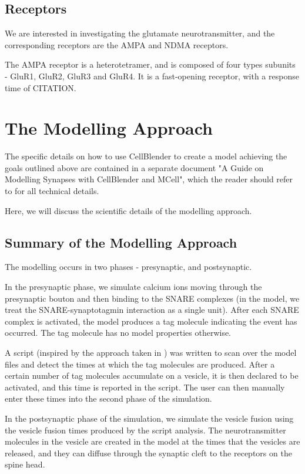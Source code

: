 \documentclass[a4paper]{article}
\begin{document}
\subsection{Receptors}
We are interested in investigating the glutamate neurotransmitter, and the corresponding receptors are the AMPA and NDMA receptors.

The AMPA receptor is a heterotetramer, and is composed of four types subunits - GluR1, GluR2, GluR3 and GluR4. It is a fast-opening receptor, with a response time of CITATION.

\section{The Modelling Approach}

The specific details on how to use CellBlender to create a model achieving the goals outlined above are contained in a separate document "A Guide on Modelling Synapses with CellBlender and MCell", which the reader should refer to for all technical details.

Here, we will discuss the scientific details of the modelling approach.

\subsection{Summary of the Modelling Approach}
The modelling occurs in two phases - presynaptic, and postsynaptic.

In the presynaptic phase, we simulate calcium ions moving through the presynaptic bouton and then binding to the SNARE complexes (in the model, we treat the SNARE-synaptotagmin interaction as a single unit). After each SNARE complex is activated, the model produces a tag molecule indicating the event has occurred. The tag molecule has no model properties otherwise.

A script (inspired by the approach taken in \cite{ma2014quantitative}) was written to scan over the model files and detect the times at which the tag molecules are produced. After a certain number of tag molecules accumulate on a vesicle, it is then declared to be activated, and this time is reported in the script. The user can then manually enter these times into the second phase of the simulation.

In the postsynaptic phase of the simulation, we simulate the vesicle fusion using the vesicle fusion times produced by the script analysis. The neurotransmitter molecules in the vesicle are created in the model at the times that the vesicles are released, and they can diffuse through the synaptic cleft to the receptors on the spine head.
\end{document}
